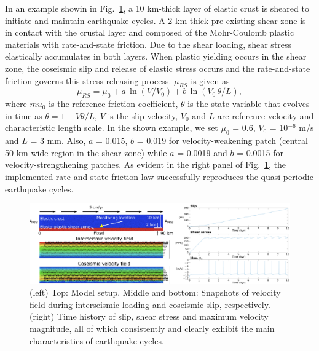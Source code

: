 \documentclass[11pt]{article} %
\begin{document}
    In an example showin in Fig.~\ref{fig:RSfriction}, a 10 km-thick layer of elastic crust is sheared to initiate and maintain earthquake cycles. A 2 km-thick pre-existing shear zone is in contact with the crustal layer and composed of the Mohr-Coulomb plastic materials with rate-and-state friction. Due to the shear loading, shear stress elastically accumulates in both layers. When plastic yielding occurs in the shear zone, the coseismic slip and release of elastic stress occurs and the rate-and-state friction governs this stress-releasing process. $\mu_{RS}$ is given as
    \begin{equation}
      \mu_{RS} = \mu_{0} + a\,\ln (V/V_{0}) + b \, \ln (V_{0}\,\theta/L),
    \end{equation}
    where $mu_{0}$ is the reference friction coefficient, $\theta$ is the state variable that evolves in time as $\dot{\theta}=1-V\theta/L$, $V$ is the slip velocity, $V_{0}$ and $L$ are reference velocity and characteristic length scale. In the shown example, we set $\mu_{0}$ = 0.6, $V_{0}$ = 10$^{-6}$ m/s and $L$ = 3 mm. Also, $a$ = 0.015, $b$ = 0.019 for velocity-weakening patch (central 50 km-wide region in the shear zone) while $a$ = 0.0019  and $b$ = 0.0015 for velocity-strengthening patches. As evident in the right panel of Fig.~\ref{fig:RSfriction}, the implemented rate-and-state friction law successfully reproduces the quasi-periodic earthquake cycles.
    
\begin{figure}
 \includegraphics[width=\textwidth]{./RSfriction01.png}
 \caption{(left) Top: Model setup. Middle and bottom: Snapshots of velocity field during interseismic loading and coseismic slip, respectively. (right) Time history of slip, shear stress and maximum velocity magnitude, all of which consistently and clearly exhibit the main characteristics of earthquake cycles.}
 \label{fig:RSfriction}
\end{figure}

    
    
    
\end{document}
